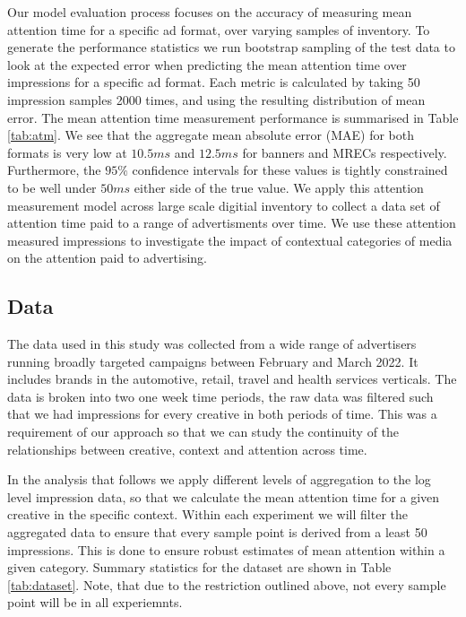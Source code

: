 \documentclass[sigconf]{acmart}
\begin{document}
Our model evaluation process focuses on the accuracy of measuring mean
attention time for a specific ad format, over varying samples of inventory.
To generate the performance statistics we run bootstrap sampling of the test data
to look at the expected error when predicting the mean attention time over
impressions for a specific ad format. Each metric is calculated by taking 50 impression
samples 2000 times, and using the resulting distribution of mean error.
The mean attention time measurement performance is summarised in Table
\ref{tab:atm}.
We see that the aggregate mean absolute error (MAE) for both formats is very low
at $10.5 ms$ and $12.5 ms$ for banners and MRECs respectively. Furthermore, the
$95\%$ confidence intervals for these values is tightly constrained to be well under
$50 ms$ either side of the true value.
We apply this attention measurement model across large scale digitial inventory to
collect a data set of attention time paid to a range of advertisments over time.
We use these attention measured impressions to investigate the
impact of contextual categories of media on the attention paid to advertising.

\subsection{Data}
The data used in this study was collected from a wide range of advertisers running
broadly targeted campaigns between February and March 2022. It includes brands in
the automotive, retail, travel and health services verticals.
The data is broken into two one week time periods, the raw data was filtered
such that we had impressions for every creative in both
periods of time. This was a requirement of our approach so that we can
study the continuity of the relationships between creative, context and attention
across time.

In the analysis that follows we apply different levels of aggregation to the
log level impression data, so that we calculate the mean attention time for
a given creative in the specific context. Within each experiment we will
filter the aggregated data to ensure that every sample point is derived from
a least 50 impressions. This is done to ensure robust estimates of mean attention within
a given category.
Summary statistics for the dataset are shown in Table \ref{tab:dataset}. Note, that
due to the restriction outlined above, not every sample point will be in all experiemnts.
\end{document}
